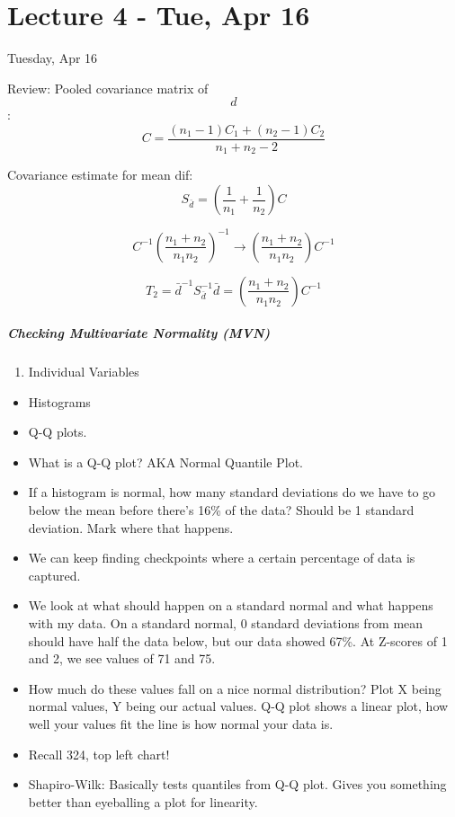 \hypertarget{lecture-4---tue-apr-16}{%
\chapter{Lecture 4 - Tue, Apr 16}\label{lecture-4---tue-apr-16}}

Tuesday, Apr 16

Review: Pooled covariance matrix of \[d\]:
\[C = \frac{(n_1 - 1)C_1 + (n_2 - 1)C_2}{n_1 + n_2 - 2}\]

Covariance estimate for mean dif:
\[S_\bar{d} = (\frac{1}{n_1} + \frac{1}{n_2})C\]

\[C^{-1}(\frac{n_1 + n_2}{n_1n_2})^{-1} \to (\frac{n_1 + n_2}{n_1n_2})C^{-1}\]

\[T_2 = \bar{d}^{-1} S_\bar{d}^{-1}\bar{d} = (\frac{n_1 + n_2}{n_1n_2})C^{-1}\]

\hypertarget{checking-multivariate-normality-mvn}{%
\paragraph{Checking Multivariate Normality
(MVN)}\label{checking-multivariate-normality-mvn}}

\begin{enumerate}
\def\labelenumi{\arabic{enumi}.}
\tightlist
\item
  Individual Variables
\end{enumerate}

\begin{itemize}
\tightlist
\item
  Histograms
\item
  Q-Q plots.
\item
  What is a Q-Q plot? AKA Normal Quantile Plot.
\item
  If a histogram is normal, how many standard deviations do we have to
  go below the mean before there's 16\% of the data? Should be 1
  standard deviation. Mark where that happens.
\item
  We can keep finding checkpoints where a certain percentage of data is
  captured.
\item
  We look at what should happen on a standard normal and what happens
  with my data. On a standard normal, 0 standard deviations from mean
  should have half the data below, but our data showed 67\%. At Z-scores
  of 1 and 2, we see values of 71 and 75.
\item
  How much do these values fall on a nice normal distribution? Plot X
  being normal values, Y being our actual values. Q-Q plot shows a
  linear plot, how well your values fit the line is how normal your data
  is.
\item
  Recall 324, top left chart!
\item
  Shapiro-Wilk: Basically tests quantiles from Q-Q plot. Gives you
  something better than eyeballing a plot for linearity.
\end{itemize}

